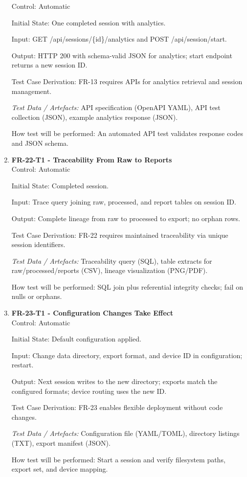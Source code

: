 \documentclass[12pt, titlepage]{article}
\begin{document}
\begin{enumerate}
Control: Automatic

Initial State: One completed session with analytics.

Input: GET /api/sessions/\{id\}/analytics and POST /api/session/start.

Output: HTTP 200 with schema-valid JSON for analytics; start endpoint returns a new session ID.

Test Case Derivation: FR-13 requires APIs for analytics retrieval and session management.

\textit{Test Data / Artefacts:} API specification (OpenAPI YAML), API test collection (JSON), example analytics response (JSON).

How test will be performed: An automated API test validates response codes and JSON schema.

\item \textbf{FR-22-T1 - Traceability From Raw to Reports} \\

Control: Automatic

Initial State: Completed session.

Input: Trace query joining raw, processed, and report tables on session ID.

Output: Complete lineage from raw to processed to export; no orphan rows.

Test Case Derivation: FR-22 requires maintained traceability via unique session identifiers.

\textit{Test Data / Artefacts:} Traceability query (SQL), table extracts for raw/processed/reports (CSV), lineage visualization (PNG/PDF).

How test will be performed: SQL join plus referential integrity checks; fail on nulls or orphans.

\item \textbf{FR-23-T1 - Configuration Changes Take Effect} \\

Control: Automatic

Initial State: Default configuration applied.

Input: Change data directory, export format, and device ID in configuration; restart.

Output: Next session writes to the new directory; exports match the configured formats; device routing uses the new ID.

Test Case Derivation: FR-23 enables flexible deployment without code changes.

\textit{Test Data / Artefacts:} Configuration file (YAML/TOML), directory listings (TXT), export manifest (JSON).

How test will be performed: Start a session and verify filesystem paths, export set, and device mapping.

\end{enumerate}
\end{document}
